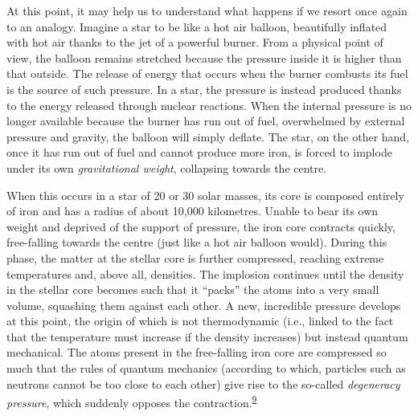 At this point, it may help us to understand what happens if we resort once again to an
analogy. Imagine a star to be like a hot air balloon, beautifully inflated with hot air
thanks to the jet of a powerful burner. From a physical point of view, the balloon
remains stretched because the pressure inside it is higher than that outside. The
release of energy that occurs when the burner combusts its fuel is the source of such
pressure. In a star, the pressure is instead produced thanks to the energy released
through nuclear reactions. When the internal pressure is no longer
available because the burner has run out of fuel, overwhelmed by external
pressure and gravity, the balloon will simply deflate. The star, on
the other hand, once it has run out of fuel and cannot produce more iron, is forced to
implode under its own \emph{gravitational weight}, collapsing towards the centre.

When this occurs in a star of 20 or 30 solar masses, its core is composed entirely of
iron and has a radius of about 10,000 kilometres. Unable to bear its
own weight and deprived of the support of pressure, the iron core
contracts quickly, free-falling towards the centre (just like a hot air balloon would).
During this phase, the matter at the stellar core is further compressed, reaching
extreme temperatures and, above all, densities. The implosion continues until the
density in the stellar core becomes such that it ``packs'' the atoms into a very small
volume, squashing them against each other. A new, incredible pressure develops at this
point, the origin of which is not thermodynamic (i.e., linked to the fact that the
temperature must increase if the density increases) but instead quantum mechanical. The
atoms present in the free-falling iron core are compressed so much that the rules of
quantum mechanics (according to which, particles such as neutrons
cannot be too close to each other) give rise to the so-called
\emph{degeneracy} \emph{pressure}, which suddenly opposes the
contraction.\textsuperscript{\hyperlink{note:05-09}{9}}

